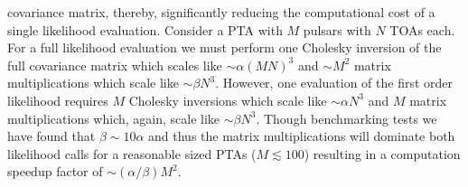 \documentclass[iop]{emulateapj} \usepackage{apjfonts}
\begin{document}
covariance matrix, thereby, significantly reducing the computational
cost of a single likelihood evaluation. Consider a PTA with $M$
pulsars with $N$ TOAs each. For a full likelihood evaluation we must
perform one Cholesky inversion of the full covariance matrix which
scales like $\sim \alpha(MN)^{3}$ and $\sim M^{2}$ matrix
multiplications which scale like $\sim\beta N^{3}$. However, one
evaluation of the first order likelihood requires $M$ Cholesky
inversions which scale like $\sim \alpha N^{3}$ and $M$ matrix
multiplications which, again, scale like $\sim \beta N^{3}$. Though
benchmarking tests we have found that $\beta\sim 10\alpha$ and thus
the matrix multiplications will dominate both likelihood calls for a
reasonable sized PTAs ($M\lesssim100$) resulting in a computation
speedup factor of $\sim (\alpha/\beta) M^{2}$.

\end{document}
